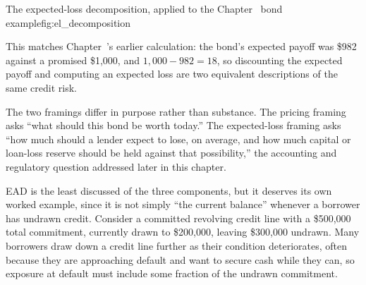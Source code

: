\documentclass[../ai_in_finance]{subfiles}
\begin{document}
\begin{bookfigure}[htbp]{The expected-loss decomposition, applied to the Chapter~ bond example}{fig:el_decomposition}
\end{bookfigure}
This matches Chapter~'s earlier calculation: the bond's expected payoff was \$982 against a promised \$1,000, and $1{,}000 - 982 = 18$, so discounting the expected payoff and computing an expected loss are two equivalent descriptions of the same credit risk.

The two framings differ in purpose rather than substance. The pricing framing asks ``what should this bond be worth today.'' The expected-loss framing asks ``how much should a lender expect to lose, on average, and how much capital or loan-loss reserve should be held against that possibility,'' the accounting and regulatory question addressed later in this chapter.

EAD is the least discussed of the three components, but it deserves its own worked example, since it is not simply ``the current balance'' whenever a borrower has undrawn credit. Consider a committed revolving credit line with a \$500,000 total commitment, currently drawn to \$200,000, leaving \$300,000 undrawn. Many borrowers draw down a credit line further as their condition deteriorates, often because they are approaching default and want to secure cash while they can, so exposure at default must include some fraction of the undrawn commitment.
\end{document}

